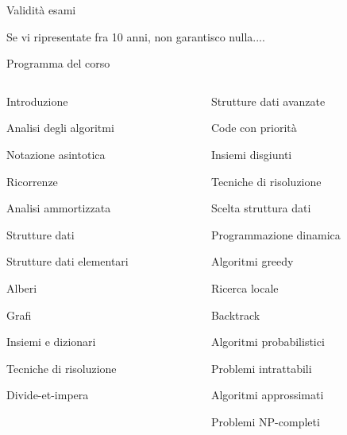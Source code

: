 \begin{frame}{Validità esami}

\vspace{-9pt}

\medskip
{}

\medskip
{}
\BI
\item Se vi ripresentate fra 10 anni, non garantisco nulla....
\EI

\end{frame}


\begin{frame}{Programma del corso}

\small
\vspace{-18pt}
\begin{columns}[T]
\begin{column}{0.48\textwidth}
\begin{myboxtitle}[Modulo 1]
\BIL
\item Introduzione
	\BI
	\item Analisi degli algoritmi
	\item Notazione asintotica
	\item Ricorrenze
	\item Analisi ammortizzata
	\EI
\item Strutture dati
	\BI
	\item Strutture dati elementari
	\item Alberi
	\item Grafi
	\item Insiemi e dizionari
	\EI
\item Tecniche di risoluzione
	\BI
	\item Divide-et-impera 
  \EI
\EIL
\end{myboxtitle}
\end{column}
\begin{column}{0.52\textwidth}
\begin{myboxtitle}[Modulo 2]
\BIL
\item Strutture dati avanzate
  \BI
  \item Code con priorità 
  \item Insiemi disgiunti 
  \EI
\item Tecniche di risoluzione
  \BI
	\item Scelta struttura dati 
	\item Programmazione dinamica 
	\item Algoritmi greedy
	\item Ricerca locale 
	\item Backtrack
	\item Algoritmi probabilistici
	\EI
\item Problemi intrattabili
	\BI
  \item Algoritmi approssimati
	\item Problemi NP-completi
	\EI
\EIL
\end{myboxtitle}
\end{column}
\end{columns}

\end{frame}


